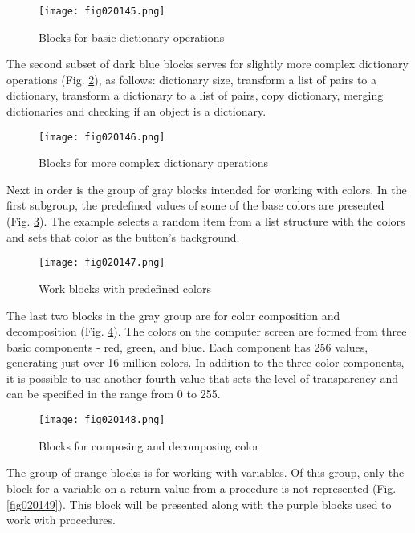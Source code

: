 \begin{figure}[H]
   \centering
   \texttt{[image: fig020145.png]}
   \caption{Blocks for basic dictionary operations}
\label{fig020145}
\end{figure}

The second subset of dark blue blocks serves for slightly more complex dictionary operations (Fig. \ref{fig020146}), as follows: dictionary size, transform a list of pairs to a dictionary, transform a dictionary to a list of pairs, copy dictionary, merging dictionaries and checking if an object is a dictionary.

\begin{figure}[H]
   \centering
   \texttt{[image: fig020146.png]}
   \caption{Blocks for more complex dictionary operations}
\label{fig020146}
\end{figure}

Next in order is the group of gray blocks intended for working with colors. In the first subgroup, the predefined values of some of the base colors are presented (Fig. \ref{fig020147}). The example selects a random item from a list structure with the colors and sets that color as the button's background.

\begin{figure}[H]
   \centering
   \texttt{[image: fig020147.png]}
   \caption{Work blocks with predefined colors}
\label{fig020147}
\end{figure}

The last two blocks in the gray group are for color composition and decomposition (Fig. \ref{fig020148}). The colors on the computer screen are formed from three basic components - red, green, and blue. Each component has 256 values, generating just over 16 million colors. In addition to the three color components, it is possible to use another fourth value that sets the level of transparency and can be specified in the range from 0 to 255.

\begin{figure}[H]
   \centering
   \texttt{[image: fig020148.png]}
   \caption{Blocks for composing and decomposing color}
\label{fig020148}
\end{figure}

The group of orange blocks is for working with variables. Of this group, only the block for a variable on a return value from a procedure is not represented (Fig. \ref{fig020149}). This block will be presented along with the purple blocks used to work with procedures.

